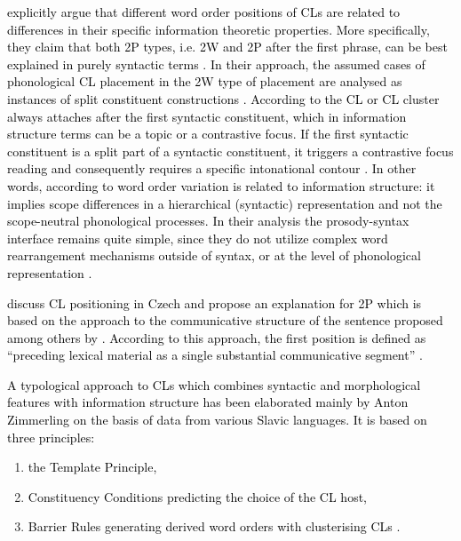 \textcolor{black}{\citet[139]{CavarSeiss11} explicitly argue that different word order positions of CLs are related to differences in their specific information theoretic properties. More specifically, they claim that both 2P types, i.e. 2W and 2P after the first phrase, can be best explained in purely syntactic terms \citep[133]{CavarSeiss11}. In their approach, the assumed cases of phonological CL placement in the 2W type of placement are analysed as instances of split constituent constructions \citep[133, 136, 141]{CavarSeiss11}. According to \citet[145]{CavarSeiss11} the CL or CL cluster always attaches after the first syntactic constituent, which in information structure terms can be a topic or a contrastive focus. If the first syntactic constituent is a split part of a syntactic constituent, it triggers a contrastive focus reading and consequently requires a specific intonational contour \citep[145]{CavarSeiss11}. In other words, according to \citet[133]{CavarSeiss11} word order variation is related to information structure: it implies scope differences in a hierarchical (syntactic) representation and not the scope-neutral phonological processes. In their analysis the prosody-syntax interface remains quite simple, since they do not utilize complex word rearrangement mechanisms outside of syntax, or at the level of phonological representation \citep[133]{CavarSeiss11}.}

\textcolor{black}{\citet{AvgustinovaOliva95} discuss CL positioning in Czech and propose an explanation for 2P which is based on the approach to the communicative structure of the sentence proposed among others by \citet{Sgalletal86}. According to this approach, the first position is defined as “preceding lexical material as a single substantial communicative segment” \citep[25]{AvgustinovaOliva95}.}

\textcolor{black}{A typological approach to CLs which combines syntactic and morphological features with information structure has been elaborated mainly by Anton Zimmerling on the basis of data from various Slavic languages. It is based on three principles:} 

\begin{enumerate}
	
\item \textcolor{black}{the Template Principle,}
\item \textcolor{black}{Constituency Conditions predicting the choice of the CL host,}
\item \textcolor{black}{Barrier Rules generating derived word orders with clusterising CLs \citep[203]{ZimmerlingKosta13}.}

\end{enumerate}

